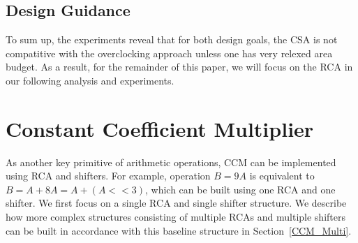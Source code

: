 \documentclass[prodmode,acmtrets]{acmsmall} %
\begin{document}
\subsection{Design Guidance}
To sum up, the experiments reveal that for both design goals, the CSA is not compatitive with the overclocking approach unless one has very relexed area budget. As a result, for the remainder of this paper, we will focus on the RCA in our following analysis and experiments.


\section{Constant Coefficient Multiplier}\label{section_CCM}

As another key primitive of arithmetic operations, CCM can be implemented using RCA and shifters. For example, operation $B=9A$ is equivalent to $B=A+8A=A+(A<<3)$, which can be built using one RCA and one shifter. We first focus on a single RCA and single shifter structure. We describe how more complex structures consisting of multiple RCAs and multiple shifters can be built in accordance with this baseline structure in Section~\ref{CCM_Multi}.
\end{document}
